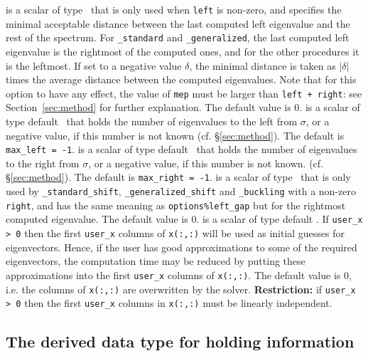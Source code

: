 \begin{description}
%
is a scalar of type \REALDP\ 
that is only used when
{\tt left} is non-zero, and
specifies the minimal acceptable distance
between the last computed left eigenvalue
and the rest of the spectrum.
For {\tt \solver\_standard} and {\tt \solver\_generalized},
the last computed left eigenvalue
is the rightmost of the computed ones,
and for the other procedures
it is the leftmost.
If set to a negative value $\delta$,
the minimal distance is taken as
$|\delta|$ times the average distance between the computed eigenvalues.
Note that for this option to have any effect,
the value of {\tt mep} must be larger than
{\tt left + right}: see Section~\ref{sec:method}
for further explanation.
The default value is 0.
%
is a scalar of type default \Integer\ that
holds the number of eigenvalues to the left from $\sigma$,
or a negative value, if this number is not known
(cf. \S\ref{sec:method}).
The default is {\tt max\_left = -1}.
%
is a scalar of type default \Integer\ that
holds the number of eigenvalues to the right from $\sigma$,
or a negative value, if this number is not known.
(cf. \S\ref{sec:method}).
The default is {\tt max\_right = -1}.
%
is a scalar of type \REALDP\ 
that is only used by 
{\tt \solver\_standard\_shift}, {\tt \solver\_generalized\_shift}
and {\tt \solver\_buckling}
with a non-zero {\tt right}, and
has the same meaning as {\tt options\%left\_gap}
but for the rightmost computed eigenvalue.
The default value is 0.
%
 is a scalar of type default \Integer. 
If {\tt user\_x > 0} then the first {\tt user\_x} columns
of {\tt x(:,:)} will be used as initial guesses for eigenvectors.
Hence, if the user has good approximations
to some of the required eigenvectors, the computation time
may be reduced by putting these approximations
into the first {\tt user\_x} columns of {\tt x(:,:)}.
The default value is 0, 
i.e. the columns of {\tt x(:,:)} are overwritten by the solver.
{\bf Restriction:} if {\tt user\_x > 0} then
the first {\tt user\_x} columns in {\tt x(:,:)}
must be linearly independent.
%
\end{description}

\subsection{The derived data type for holding information}

\label{sec:inform}

